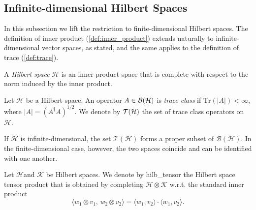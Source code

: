 \subsection{Infinite-dimensional Hilbert Spaces}
In this subsection we lift the restriction to finite-dimensional Hilbert spaces.
The definition of inner product
(\autoref{def:inner_product}) extends naturally to infinite-dimensional vector spaces, as stated, and the same applies to the definition of trace (\autoref{def:trace}).

\begin{definition}
  A \emph{Hilbert space} $\mathcal{H}$ is an inner product space that is complete with respect to the norm induced by the inner product.
\end{definition}

\begin{definition}
  Let $\mathcal{H}$ be a Hilbert space. An operator $A \in \mathcal{B}(\mathcal{H}) $ is \emph{trace class} if $\text{Tr}(|A|) < \infty$, where $|A|= \left(A^\dag A \right)^{1/2}$.  We denote by $\mathcal{T} (\mathcal{H})$ the set of trace class operators on $\mathcal{H}$.
\end{definition}
If $\mathcal{H}$ is infinite-dimensional, the set $\mathcal{T}(\mathcal{H})$ forms a proper subset of $\mathcal{B}(\mathcal{H})$. In the finite-dimensional case, however, the two spaces coincide and can be identified with one another.

\begin{definition}
  Let \( \mathcal{H} \)and \( \mathcal{K} \) be Hilbert spaces. We denote by \gls{hilb_tensor} the Hilbert space tensor product that is obtained by completing \( \mathcal{H}  \otimes \mathcal{K} \) w.r.t. the standard inner product
\[
\langle w_1 \otimes v_1,\, w_2 \otimes v_2 \rangle = \langle w_1, v_2 \rangle \cdot \langle w_1, v_2 \rangle.
\] 
\end{definition}


